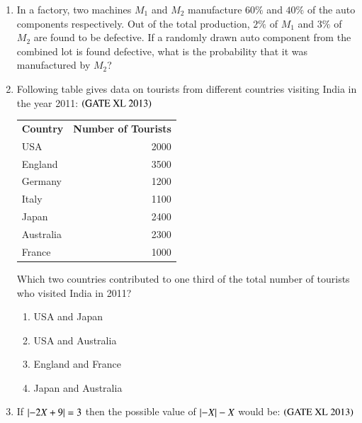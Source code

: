 \documentclass[journal]{IEEEtran}
\begin{document}
\begin{enumerate}
\item  
In a factory, two machines $M_1$ and $M_2$ manufacture $60\%$ and $40\%$ of the auto components respectively. Out of the total production, $2\%$ of $M_1$ and $3\%$ of $M_2$ are found to be defective. If a randomly drawn auto component from the combined lot is found defective, what is the probability that it was manufactured by $M_2$? \hfill \textit\textit{}
\begin{enumerate}
\end{enumerate}

\item  
Following table gives data on tourists from different countries visiting India in the year 2011: \hfill $\left(\text{GATE XL 2013}\right)$
\begin{center}
\begin{tabular}{|l|r|}

\textbf{Country} & \textbf{Number of Tourists} \\

USA & 2000 \\
England & 3500 \\
Germany & 1200 \\
Italy & 1100 \\
Japan & 2400 \\
Australia & 2300 \\
France & 1000 \\

\end{tabular}
\end{center}
Which two countries contributed to one third of the total number of tourists who visited India in 2011?
\begin{enumerate}
    \item USA and Japan
    \item USA and Australia
    \item England and France
    \item Japan and Australia
\end{enumerate}

\item  
If $\left\vert-2X + 9\right\vert = 3$ then the possible value of $\left\vert-X\right\vert - X$ would be: \hfill $\left(\text{GATE XL 2013}\right)$
\begin{enumerate}
\end{enumerate}


\end{enumerate}
\end{document}

